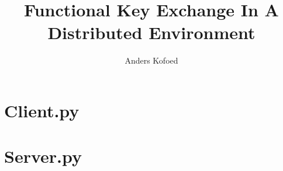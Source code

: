 \documentclass{MScthesisITEM}
\title{Functional Key Exchange In A Distributed Environment}
\author{Anders Kofoed}
\begin{document}
\pagestyle{plain}

\titleITEM
{}





\tableofcontents*
\newpage
\listoffigures



\printglossaries %
\glsaddall

\pagestyle{ruled}





\renewcommand*{\bibname}{References}



 \appendix
 \renewcommand{\chaptername}{\appendixname}
 \chapter{Client.py}\label{clientcode}


\chapter{Server.py}\label{servercode}

\end{document}
